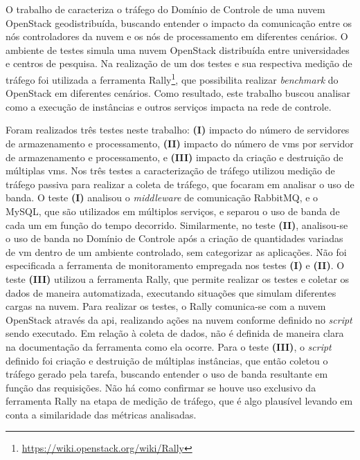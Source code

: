 O trabalho de  caracteriza o tráfego do Domínio de Controle de uma nuvem OpenStack geodistribuída, buscando entender o impacto da comunicação entre os nós controladores da nuvem e os nós de processamento em diferentes cenários. 
%
O ambiente de testes simula uma nuvem OpenStack distribuída entre universidades e centros de pesquisa. 
%
Na realização de um dos testes e sua respectiva medição de tráfego foi utilizada a ferramenta Rally\footnote{\url{https://wiki.openstack.org/wiki/Rally}}, que possibilita realizar \textit{benchmark} do OpenStack em diferentes cenários.
%
Como resultado, este trabalho buscou analisar como a execução de instâncias e outros serviços impacta na rede de controle.

Foram realizados três testes neste trabalho: \textbf{(I)} impacto do número de servidores de armazenamento e processamento, \textbf{(II)} impacto do número de \acp{vm} por servidor de armazenamento e processamento, e \textbf{(III)} impacto da criação e destruição de múltiplas \acp{vm}.
%
Nos três testes a caracterização de tráfego utilizou medição de tráfego passiva para realizar a coleta de tráfego, que focaram em analisar o uso de banda.
%
O teste \textbf{(I)} analisou o \textit{middleware} de comunicação RabbitMQ, e o MySQL, que são utilizados em múltiplos serviços, e separou o uso de banda de cada um em função do tempo decorrido.
%
Similarmente, no teste \textbf{(II)}, analisou-se o uso de banda no Domínio de Controle após a criação de quantidades variadas de \ac{vm} dentro de um ambiente controlado, sem categorizar as aplicações.
%
Não foi especificada a ferramenta de monitoramento empregada nos testes \textbf{(I)} e \textbf{(II)}. 
%
O teste \textbf{(III)} utilizou a ferramenta Rally, que permite realizar os testes e coletar os dados de maneira automatizada, executando situações que simulam diferentes cargas na nuvem.
%
Para realizar os testes, o Rally comunica-se com a nuvem OpenStack através da \ac{api}, realizando ações na nuvem conforme definido no \textit{script} sendo executado.
%
Em relação à coleta de dados, não é definida de maneira clara na documentação da ferramenta como ela ocorre.
%
Para o teste \textbf{(III)}, o \textit{script} definido foi criação e destruição de múltiplas instâncias, que então coletou o tráfego gerado pela tarefa, buscando entender o uso de banda resultante em função das requisições.
%
Não há como confirmar se houve uso exclusivo da ferramenta Rally na etapa de medição de tráfego, que é algo plausível levando em conta a similaridade das métricas analisadas.


